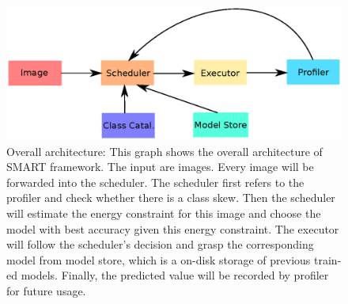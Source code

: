 \documentclass{article}
\begin{document}

\begin{figure} 
\includegraphics[scale=0.46]{Architecture.ps}
\caption{Overall architecture: This graph shows the overall architecture of SMART framework. The input are images. Every image will be forwarded into the scheduler. The scheduler first refers to the profiler and check whether there is a class skew. Then the scheduler will estimate the energy constraint for this image and choose the model with best accuracy given this energy constraint. The executor will follow the scheduler's decision and grasp the corresponding model from model store, which is a on-disk storage of previous train-ed models. Finally, the predicted value will be recorded by profiler for future usage.}
\label{fig:Architecture}
\end{figure}
\end{document}
